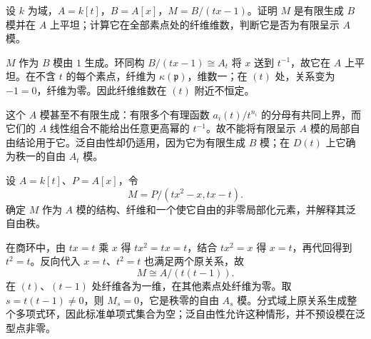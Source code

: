 \begin{exercise}\label{g5:ex:generic-free-empty-fiber}
	设 \(k\) 为域，\(A=k[t]\)，\(B=A[x]\)，\(M=B/(tx-1)\)。证明 \(M\) 是有限生成 \(B\) 模并在 \(A\) 上平坦；计算它在全部素点处的纤维维数，判断它是否为有限呈示 \(A\) 模。
\end{exercise}
\begin{solution}
	\(M\) 作为 \(B\) 模由 \(1\) 生成。环同构 \(B/(tx-1)\cong A_t\) 将 \(x\) 送到 \(t^{-1}\)，故它在 \(A\) 上平坦。在不含 \(t\) 的每个素点，纤维为 \(\kappa(\mathfrak p)\)，维数一；在 \((t)\) 处，关系变为 \(-1=0\)，纤维为零。因此纤维维数在 \((t)\) 附近不恒定。

	这个 \(A\) 模甚至不有限生成：有限多个有理函数 \(a_i(t)/t^{n_i}\) 的分母有共同上界，而它们的 \(A\) 线性组合不能给出任意更高幂的 \(t^{-1}\)。故不能将有限呈示 \(A\) 模的局部自由结论用于它。泛自由性却仍适用，因为它为有限生成 \(B\) 模；在 \(D(t)\) 上它确为秩一的自由 \(A_t\) 模。
\end{solution}

\begin{exercise}\label{g5:ex:generic-zero-module}
	设 \(A=k[t]\)、\(P=A[x]\)，令
	\[
		M=P/(tx^2-x,tx-t).
	\]
	确定 \(M\) 作为 \(A\) 模的结构、纤维和一个使它自由的非零局部化元素，并解释其泛自由秩。
\end{exercise}
\begin{solution}
	在商环中，由 \(tx=t\) 乘 \(x\) 得 \(tx^2=tx=t\)，结合 \(tx^2=x\) 得 \(x=t\)，再代回得到 \(t^2=t\)。反向代入 \(x=t\)、\(t^2=t\) 也满足两个原关系，故
	\[
		M\cong A/(t(t-1)).
	\]
	在 \((t)\)、\((t-1)\) 处纤维各为一维，在其他素点处纤维为零。取 \(s=t(t-1)\ne0\)，则 \(M_s=0\)，它是秩零的自由 \(A_s\) 模。分式域上原关系生成整个多项式环，因此标准单项式集合为空；泛自由性允许这种情形，并不预设模在泛型点非零。
\end{solution}

